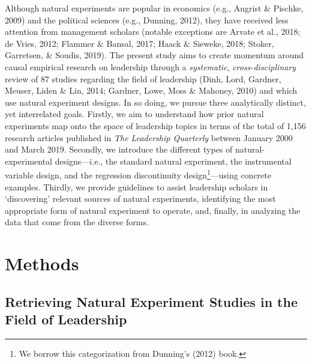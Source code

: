 \documentclass[english]{article}
\begin{document}
Although natural experiments are popular in economics (e.g., Angrist \& Pischke,
2009) and the political sciences (e.g., Dunning, 2012), they have received less
attention from management scholars (notable exceptions are Arvate et al., 2018;
	de Vries, 2012; Flammer \& Bansal, 2017; Haack \& Sieweke, 2018; Stoker,
Garretsen, \& Soudis, 2019). The present study aims to create momentum around
causal empirical research on leadership through a \emph{systematic},
\emph{cross-disciplinary} review of 87 studies regarding the field of leadership
(Dinh, Lord, Gardner, Meuser, Liden \& Lin, 2014; Gardner, Lowe, Moss \&
Mahoney, 2010) and which use natural experiment designs.  In so doing, we pursue
three analytically distinct, yet interrelated goals. Firstly, we aim to
understand how prior natural experiments map onto the space of leadership topics
in terms of the total of 1,156 research articles published in \emph{The
Leadership Quarterly} between January 2000 and March 2019. Secondly, we
introduce the different types of natural-experimental designs---i.e., the
standard natural experiment, the instrumental variable design, and the
regression discontinuity design\footnote{We borrow this categorization from
Dunning's (2012) book.}---using concrete examples. Thirdly, we provide
guidelines to assist leadership scholars in `discovering' relevant sources of
natural experiments, identifying the most appropriate form of natural experiment
to operate, and, finally, in analyzing the data that come from the diverse
forms. 

\section{Methods}\label{sec:methods}

\subsection{Retrieving Natural Experiment Studies in the Field of
Leadership}
\end{document}
